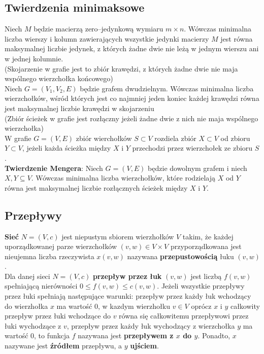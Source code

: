 \documentclass[a4paper,12pt]{article}
\begin{document}
\subsection{Twierdzenia minimaksowe}
Niech $M$ będzie macierzą zero--jedynkową wymiaru $m\times n$. Wówczas minimalna liczba wierszy i kolumn zawierających wszystkie jedynki macierzy $M$ jest równa maksymalnej liczbie jedynek, z których żadne dwie nie leżą w jednym wierszu ani w jednej kolumnie.\\
(Skojarzenie w grafie jest to zbiór krawędzi, z których żadne dwie nie maja wspólnego wierzchołka końcowego)\\
Niech $G=(V_1, V_2, E)$ będzie grafem dwudzielnym. Wówczas minimalna liczba wierzchołków, wśród których jest co najmniej jeden koniec każdej krawędzi równa jest maksymalnej liczbie krawędzi w skojarzeniu\\
(Zbiór ścieżek w grafie jest rozłączny jeżeli żadne dwie z nich nie maja wspólnego wierzchołka)\\
W grafie $G=(V, E)$ zbiór wierchołków $S\subset V$ rozdiela zbiór $X\subset V$ od zbioru $Y\subset V$, jeżeli każda ścieżka między $X$ i $Y$ przechodzi przez wierzchołek ze zbioru $S$.\\
\textbf{Twierdzenie Mengera}: Niech $G=(V,E)$ będzie dowolnym grafem i niech $X, Y\subseteq V$. Wówczas minimalna liczba wierzchołków, które rodzielają $X$ od $Y$ równa jest maksymalnej liczbie rozłącznych ścieżek między $X$ i $Y$.
\subsection{Przepływy}
\textbf{Sieć} $N=(V,c)$ jest niepustym sbiorem wierzhołków $V$ takim, że każdej uporządkowanej parze wierzchołków $(v,w)\in V\times V$ przyporządkowana jest nieujemna liczba rzeczywista $x(v,w)$ nazywana \textbf{przepustowością} łuku $(v,w)$.\\
Dla danej sieci $N=(V,c)$ \textbf{przepływ przez łuk} $(v,w)$ jest liczbą $f(v,w)$ spełniającą nierówności $0\leq f(v,w) \leq c(v,w)$. Jeżeli wszystkie przepływy przez łuki spełniają następujące warunki: przepływ przez każdy łuk wchodzący do wierzhołka $x$ ma wartość 0, w kazdym wierzhołku $v\in V$ oprócz $x$ i $y$ całkowity przepływ przez łuki wchodzące do $v$ równa się całkowitemu przepływowi przez łuki wychodzące z $v$, przepływ przez każdy łuk wychodzący z wierzchołka $y$ ma wartość 0, to funkcja $f$ nazywana jest \textbf{przepływem z $x$ do $y$}. Ponadto, $x$ nazywane jest \textbf{źródłem} przepływu, a $y$ \textbf{ujściem}.\\
\end{document}
